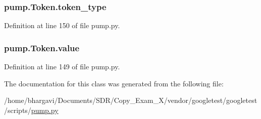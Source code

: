 \subsubsection[{\texorpdfstring{token\+\_\+type}{token_type}}]{\setlength{\rightskip}{0pt plus 5cm}pump.\+Token.\+token\+\_\+type}\hypertarget{classpump_1_1_token_aeac105b76f6af13c8c64ba0a94e37d90}{}\label{classpump_1_1_token_aeac105b76f6af13c8c64ba0a94e37d90}


Definition at line 150 of file pump.\+py.

\subsubsection[{\texorpdfstring{value}{value}}]{\setlength{\rightskip}{0pt plus 5cm}pump.\+Token.\+value}\hypertarget{classpump_1_1_token_a5b7ab395a380b775b2bf0a8b0abfda86}{}\label{classpump_1_1_token_a5b7ab395a380b775b2bf0a8b0abfda86}


Definition at line 149 of file pump.\+py.



The documentation for this class was generated from the following file\+:\begin{DoxyCompactItemize}
\item 
/home/bhargavi/\+Documents/\+S\+D\+R/\+Copy\+\_\+\+Exam\+\_\+X/vendor/googletest/googletest/scripts/\hyperlink{pump_8py}{pump.\+py}\end{DoxyCompactItemize}
